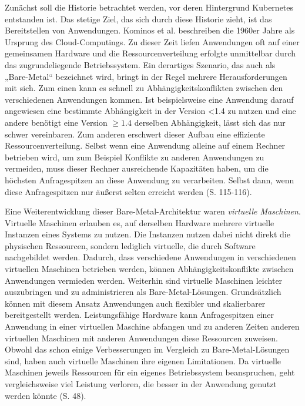 \documentclass[11pt,a4paper]{article}
\begin{document}
Zunächst soll die Historie betrachtet werden, vor deren Hintergrund Kubernetes entstanden ist.
Das stetige Ziel, das sich durch diese Historie zieht, ist das Bereitstellen von Anwendungen.
Kominos et al. \cite{7899247} beschreiben die 1960er Jahre als Ursprung des Cloud-Computings.
Zu dieser Zeit liefen Anwendungen oft auf einer gemeinsamen Hardware und die Ressourcenverteilung erfolgte unmittelbar durch das zugrundeliegende Betriebssystem.
Ein derartiges Szenario, das auch als „Bare-Metal“ bezeichnet wird, bringt in der Regel mehrere Herausforderungen mit sich.
Zum einen kann es schnell zu Abhängigkeitskonflikten zwischen den verschiedenen Anwendungen kommen.
Ist beispielsweise eine Anwendung darauf angewiesen eine bestimmte Abhängigkeit in der Version <1.4 zu nutzen und eine andere
benötigt eine Version \(\geq 1.4\) derselben Abhängigkeit, lässt sich das nur schwer vereinbaren.
Zum anderen erschwert dieser Aufbau eine effiziente Ressourcenverteilung.
Selbst wenn eine Anwendung alleine auf einem Rechner betrieben wird, um zum Beispiel Konflikte zu anderen
Anwendungen zu vermeiden, muss dieser Rechner ausreichende Kapazitäten haben, um die höchsten Anfragespitzen an diese Anwendung zu verarbeiten.
Selbst dann, wenn diese Anfragespitzen nur äußerst selten erreicht werden \cite{Schmeling_Dargatz_2022} (S. 115-116).

Eine Weiterentwicklung dieser Bare-Metal-Architektur waren \emph{virtuelle Maschinen}.
Virtuelle Maschinen erlauben es, auf derselben Hardware mehrere virtuelle Instanzen eines
Systems zu nutzen. Die Instanzen nutzen dabei nicht direkt die physischen Ressourcen, sondern lediglich virtuelle,
die durch Software nachgebildet werden.
Dadurch, dass verschiedene Anwendungen in verschiedenen virtuellen Maschinen betrieben werden, können Abhängigkeitskonflikte zwischen Anwendungen
vermieden werden. Weiterhin sind virtuelle Maschinen leichter auszubringen und zu administrieren als Bare-Metal-Lösungen.
Grundsätzlich können mit diesem Ansatz Anwendungen auch flexibler und skalierbarer bereitgestellt werden.
Leistungsfähige Hardware kann Anfragespitzen einer Anwendung in einer virtuellen Maschine abfangen und
zu anderen Zeiten anderen virtuellen Maschinen mit anderen
Anwendungen diese Ressourcen zuweisen.
Obwohl das schon einige Verbesserungen im Vergleich zu Bare-Metal-Lösungen sind, haben auch virtuelle Maschinen ihre eigenen Limitationen.
Da virtuelle Maschinen jeweils Ressourcen für ein eigenes Betriebssystem beanspruchen, geht vergleichsweise viel Leistung verloren,
die besser in der Anwendung genutzt werden könnte \cite{kofler2021docker} (S. 48).
\end{document}
